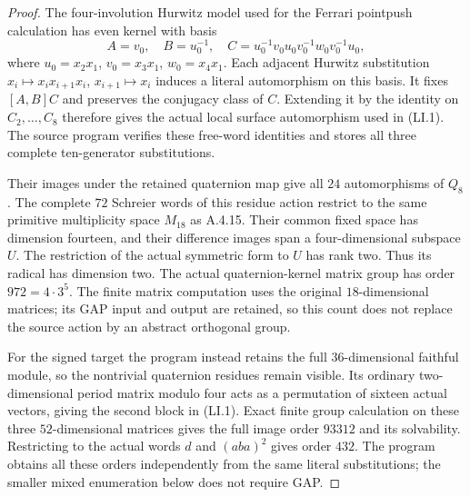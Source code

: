 \begin{proof}
The four-involution Hurwitz model used for the Ferrari
pointpush calculation has even kernel with basis
\[
 A=v_0,\quad B=u_0^{-1},\quad
 C=u_0^{-1}v_0u_0v_0^{-1}w_0v_0^{-1}u_0,
\]
where $u_0=x_2x_1$, $v_0=x_3x_1$, $w_0=x_4x_1$.
Each adjacent Hurwitz substitution
$x_i\mapsto x_ix_{i+1}x_i$, $x_{i+1}\mapsto x_i$
induces a literal automorphism on this basis.  It fixes
$[A,B]C$ and preserves the conjugacy class of $C$.
Extending it by the identity on $C_2,\ldots,C_8$ therefore
gives the actual local surface automorphism used in (LI.1).
The source program verifies these free-word identities and
stores all three complete ten-generator substitutions.

Their images under the retained quaternion map give all
$24$ automorphisms of $Q_8$.  The complete $72$ Schreier
words of this residue action restrict to the same primitive
multiplicity space $M_{18}$ as A.4.15.  Their common fixed
space has dimension fourteen, and their difference images
span a four-dimensional subspace $U$.  The restriction of
the actual symmetric form to $U$ has rank two.  Thus its
radical has dimension two.  The actual quaternion-kernel
matrix group has order $972=4\cdot3^5$.
The finite matrix computation uses the original $18$-dimensional
matrices; its GAP input and output are retained, so this
count does not replace the source action by an abstract
orthogonal group.

For the signed target the program instead retains the full
$36$-dimensional faithful module, so the nontrivial quaternion
residues remain visible.  Its ordinary two-dimensional period
matrix modulo four acts as a permutation of sixteen actual
vectors, giving the second block in (LI.1).  Exact finite group
calculation on these three $52$-dimensional matrices gives the
full image order $93312$ and its solvability.  Restricting to
the actual words $d$ and $(aba)^2$ gives order $432$.
The program obtains all these orders independently from the
same literal substitutions; the smaller mixed enumeration
below does not require GAP.


\end{proof}
